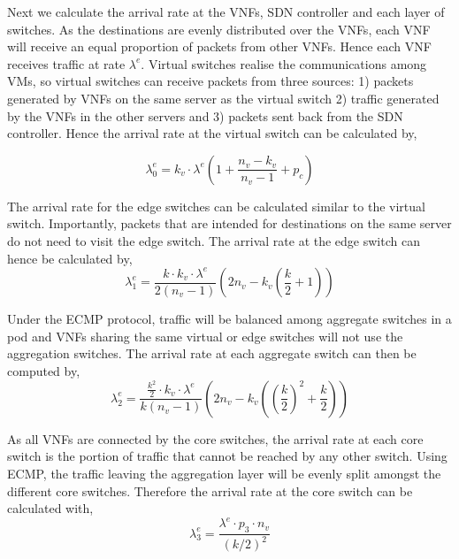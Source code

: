 Next we calculate the arrival rate at the VNFs, SDN controller and each layer of switches. As the destinations are evenly distributed over the VNFs, each VNF will receive an equal proportion of packets from other VNFs. Hence each VNF receives traffic at rate $\lambda^e$. Virtual switches realise the communications among VMs, so virtual switches can receive packets from three sources: 1) packets generated by VNFs on the same server as the virtual switch 2) traffic generated by the VNFs in the other servers and 3) packets sent back from the SDN controller. Hence the arrival rate at the virtual switch can be calculated by,

\begin{equation}
    \label{eq:arr_srv}
    \lambda_0^e = k_v \cdot \lambda^e \left(1+\frac{n_v - k_v}{n_v - 1} + p_c \right)
\end{equation}

The arrival rate for the edge switches can be calculated similar to the virtual switch. Importantly, packets that are intended for destinations on the same server do not need to visit the edge switch. The arrival rate at the edge switch can hence be calculated by,
\begin{equation}
    \label{eq:arr_edge}
    \lambda_1^e = \frac{k \cdot k_v \cdot \lambda^e}{2(n_v - 1)}\left(2n_v - k_v \left(\frac{k}{2} + 1 \right)\right)
\end{equation}

Under the ECMP protocol, traffic will be balanced among aggregate switches in a pod and VNFs sharing the same virtual or edge switches will not use the aggregation switches. The arrival rate at each aggregate switch can then be computed by,
\begin{equation}
    \label{eq:arr_agg}
    \lambda_2^e = \frac{\frac{k^2}{2} \cdot k_v \cdot \lambda^e}{k(n_v - 1)}\left(2n_v - k_v \left(\left(\frac{k}{2}\right)^2 + \frac{k}{2} \right)\right)
\end{equation}

As all VNFs are connected by the core switches, the arrival rate at each core switch is the portion of traffic that cannot be reached by any other switch. Using ECMP, the traffic leaving the aggregation layer will be evenly split amongst the different core switches. Therefore the arrival rate at the core switch can be calculated with,
\begin{equation}
    \label{eq:arr_core}
    \lambda_3^e =\frac{\lambda^e \cdot p_3 \cdot n_v}{(k/2)^2}
\end{equation}

